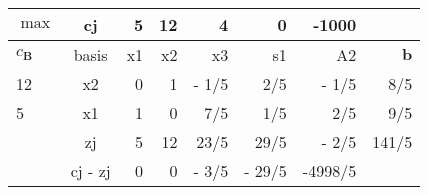 \begin{frameExample}{}{}
\begin{onlyenv}
  \begin{table}[!ht]
    \centering
    \begin{tabular}{lc|rrrrr|r}
    \toprule
      $\max$ & cj & 5 & 12 & 4 & 0 & -1000 & ~ \\
      \midrule
      $c_{\boldsymbol{B}}$ & basis & x1 & x2 & x3 & s1 & A2 & $\boldsymbol{b}$ \\
      \midrule
        12 & x2 & 0 & 1 & -   1/5    &    2/5    & -   1/5    &    8/5    \\ 
      5 & x1 & 1 & 0 &    7/5    &    1/5    &    2/5    &    9/5    \\
      \midrule
        ~ & zj & 5 & 12 &   23/5    &   29/5    & -   2/5    &  141/5    \\ 
      ~ & cj - zj & 0 & 0 & -   3/5    & -  29/5    & -4998/5 \\
      \bottomrule
    \end{tabular}
\end{table}
\end{onlyenv}
\end{frameExample}


